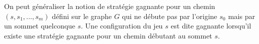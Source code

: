 \documentclass[12pt,fancy]{cours}
\begin{document}
On peut généraliser la notion de stratégie gagnante pour un chemin $(s,s_1,...,s_m)$ défini sur le graphe $G$ qui ne débute pas par l'origine $s_0$ mais par un sommet quelconque $s$. Une configuration du jeu $s$ est dite gagnante lorsqu'il existe une stratégie gagnante pour un chemin débutant au sommet $s$.
\end{document}
